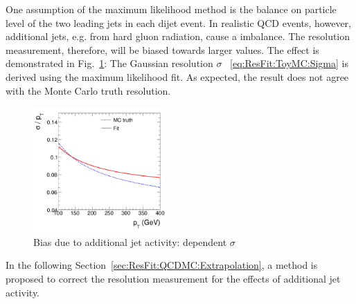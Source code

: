 One assumption of the maximum likelihood method is the \pt balance on
particle level of the two leading jets in each dijet event.
In realistic QCD events, however, additional jets, e.g. from hard
gluon radiation, cause a \ptparticle imbalance.
The resolution measurement, therefore, will be biased
towards larger values.
The effect is demonstrated in Fig.~\ref{fig:ResFit:QCDMC:AddJetAct:Fit}: 
The Gaussian resolution $\sigma$ ~\eqref{eq:ResFit:ToyMC:Sigma} is derived using the maximum
likelihood fit.
As expected, the result does not agree with the Monte Carlo truth
resolution.
\begin{figure}[ht]
  \centering
  \includegraphics[width=0.45\textwidth]{figures/resFit_PtDependentSigma}
  \caption{Bias due to additional jet activity: \pt dependent $\sigma$}
  \label{fig:ResFit:QCDMC:AddJetAct:Fit}
\end{figure}

In the following Section~\ref{sec:ResFit:QCDMC:Extrapolation}, a method is proposed to correct the resolution
measurement for the effects of additional jet activity.
